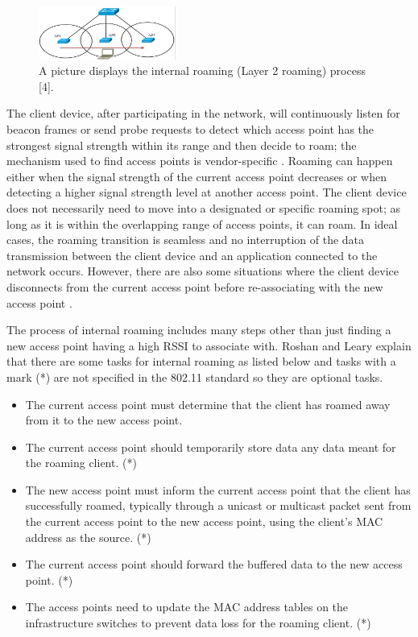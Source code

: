 \documentclass[conference]{IEEEtran}
\begin{document}
\begin{figure}[htbp]
    \centering
    \includegraphics[width=0.4\textwidth]{internal_roaming.png}
    \caption{A picture displays the internal roaming (Layer 2 roaming) process
[4].}
\end{figure}

The client device, after participating in the network, will continuously listen for beacon frames or send probe requests to detect which access point has the strongest signal strength within its range and then decide to roam; the mechanism used to find access points is vendor-specific \cite{article_example}. Roaming can happen either when the signal strength of the current access point decreases or when detecting a higher signal strength level at another access point. The client device does not necessarily need to move into a designated or specific roaming spot; as long as it is within the overlapping range of access points, it can roam. In ideal cases, the roaming transition is seamless and no interruption of the data transmission between the client device and an application connected to the network occurs. However, there are also some situations where the client device disconnects from the current access point before re-associating with the new access point \cite{article_example} \cite{book_example}.

The process of internal roaming includes many steps other than just finding a new access point having a high RSSI to associate with. Roshan and Leary \cite{article_example} explain that there are some tasks for internal roaming as listed below and tasks with a mark (*) are not specified in the 802.11 standard so they are optional tasks.

\begin{itemize}
    \item The current access point must determine that the client has roamed away from it to the new access point.
    \item The current access point should temporarily store data any data meant for the roaming client. (*)
    \item The new access point must inform the current access point that the client has successfully roamed, typically through a unicast or multicast packet sent from the current access point to the new access point, using the client's MAC address as the source. (*)
    \item The current access point should forward the buffered data to the new access point. (*)
    \item The access points need to update the MAC address tables on the infrastructure switches to prevent data loss for the roaming client. (*)
\end{itemize}
\end{document}
